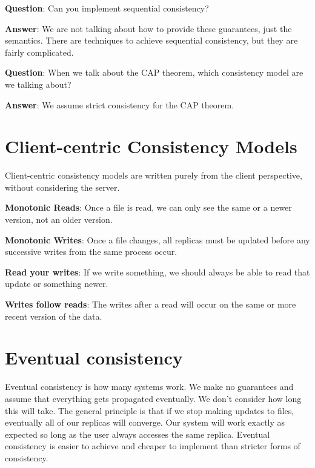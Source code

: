 \documentclass[twoside]{article}
\begin{document}
\textbf{Question}: Can you implement sequential consistency?

\textbf{Answer}: We are not talking about how to provide these guarantees, just the semantics. There are techniques to achieve sequential consistency, but they are fairly complicated.

\textbf{Question}: When we talk about the CAP theorem, which consistency model are we talking about?

\textbf{Answer}: We assume strict consistency for the CAP theorem.

\section{Client-centric Consistency Models}

Client-centric consistency models are written purely from the client perspective, without considering the server.

\begin{description}
    
    \item \textbf{Monotonic Reads}: Once a file is read, we can only see the same or a newer version, not an older version.
    
    \item \textbf{Monotonic Writes}: Once a file changes, all replicas must be updated before any successive writes from the same process occur.
    
    \item \textbf{Read your writes}: If we write something, we should always be able to read that update or something newer.
    
    \item \textbf{Writes follow reads}: The writes after a read will occur on the same or more recent version of the data.
    
\end{description}

\section{Eventual consistency}

Eventual consistency is how many systems work. We make no guarantees and assume that everything gets propagated eventually. We don’t consider how long this will take. The general principle is that if we stop making updates to files, eventually all of our replicas will converge. Our system will work exactly as expected so long as the user always accesses the same replica. Eventual consistency is easier to achieve and cheaper to implement than stricter forms of consistency.
\end{document}
